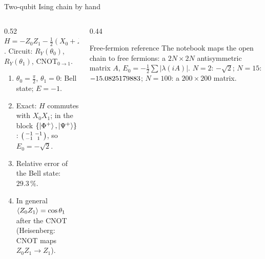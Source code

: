 \documentclass[aspectratio=169,11pt]{beamer}
\begin{document}
\begin{frame}{Two-qubit Ising chain by hand}
  \begin{columns}[T]
    \begin{column}{0.52\textwidth}
      $H = -Z_0Z_1 - \frac12(X_0 + X_1)$. Circuit: $R_Y(\theta_0)$, $R_Y(\theta_1)$, CNOT$_{0\to1}$.
      \begin{enumerate}
        \item $\theta_0 = \frac\pi2$, $\theta_1 = 0$: Bell state; $E = -1$.
        \item Exact: $H$ commutes with $X_0X_1$; in the block $\{\ket{\Phi^+}, \ket{\Psi^+}\}$: $\begin{psmallmatrix}-1&-1\\-1&1\end{psmallmatrix}$, so $E_0 = -\sqrt2$.
        \item Relative error of the Bell state: $29.3\,\%$.
        \item In general $\braket{Z_0Z_1} = \cos\theta_1$ after the CNOT (Heisenberg: CNOT maps $Z_0Z_1 \to Z_1$).
      \end{enumerate}
    \end{column}
    \begin{column}{0.44\textwidth}
      \begin{block}{Free-fermion reference}
        The notebook maps the open chain to free fermions: a $2N\times2N$ antisymmetric matrix $A$,
        $E_0 = -\tfrac12\sum|\lambda(iA)|$. $N = 2$: $-\sqrt2$; $N = 15$: $-15.0825179883$; $N = 100$: a $200\times200$ matrix.
      \end{block}
    \end{column}
  \end{columns}
\end{frame}

\end{document}
